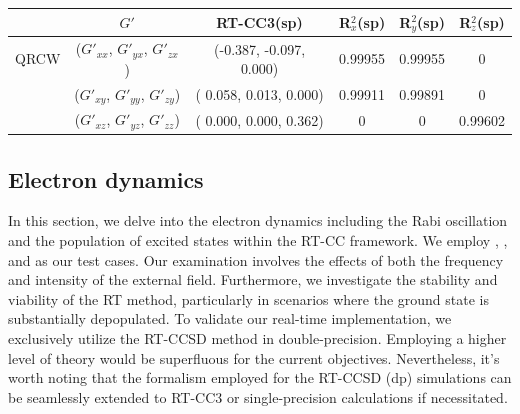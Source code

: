 \begin{table}
\begin{tabular}{c|c|c|ccc}
                 \hline
                                            &  $G'$ & \textrm{RT-CC3(sp)} & R$^{2}_{x}$(sp) & R$^{2}_{y}$(sp)& R$^{2}_{z}$(sp)\\
                                          \hline
                \textrm{QRCW} & ($G'_{xx}$, $G'_{yx}$, $G'_{zx}$) & (-0.387, -0.097, 0.000) &   0.99955 & 0.99955 & 0 \\
                                          & ($G'_{xy}$, $G'_{yy}$, $G'_{zy}$) & ( 0.058,  0.013, 0.000) &  0.99911 & 0.99891 & 0 \\
                                          & ($G'_{xz}$, $G'_{yz}$, $G'_{zz}$) & ( 0.000,  0.000, 0.362) &   0 & 0 & 0.99602 \\  
                
   \end{tabular}
  \label{tab:g-cc3}
\end{table}

\subsection{Electron dynamics}\label{results-cc3-3}

In this section, we delve into the electron dynamics including the Rabi oscillation and the population of excited states within the RT-CC framework. We employ , , and  as our test cases. Our examination involves the effects of both the frequency and intensity of the external field. Furthermore, we investigate the stability and viability of the RT method, particularly in scenarios where the ground state is substantially depopulated. To validate our real-time implementation, we exclusively utilize the RT-CCSD method in double-precision. Employing a higher level of theory would be superfluous for the current objectives. Nevertheless, it's worth noting that the formalism employed for the RT-CCSD (dp) simulations can be seamlessly extended to RT-CC3 or single-precision calculations if necessitated.

